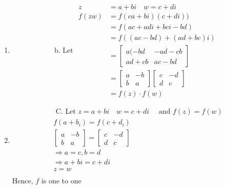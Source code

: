 \documentclass[11pt]{article}
\begin{document}
\begin{enumerate}[{\bf Q1.}]
\begin{enumerate}
			\item 
			\begin{equation}
				\text { b. Let } \begin{aligned}
				z & =a+b i \quad w=c+d i \\
				f(z w) & =f(c a+b i)(c+d i)) \\
				& =f(a c+a d i+b c i-b d) \\
				& =f((a c-b d)+(a d+b c) i) \\
				& =\left[\begin{array}{cc}
				a(-b d & -a d-c b \\
				a d+c b & a c-b d
				\end{array}\right] \\
				& =\left[\begin{array}{cc}
				a & -b \\
				b & a
				\end{array}\right]\left[\begin{array}{cc}
				c & -d \\
				d & c
				\end{array}\right] \\
				& =f(z) \cdot f(w)
				\end{aligned}
				\end{equation}

			\item 
			$$
			\begin{aligned}
			& \text { C. Let } z=a+b i \quad w=c + d i \quad \text { and } f(z)=f(w) \\
			& f\left(a+b_i\right)=f\left(c+d_i\right) \\
			& {\left[\begin{array}{cc}
			a & -b \\
			b & a
			\end{array}\right]=\left[\begin{array}{cc}
			c & -d \\
			d & c
			\end{array}\right]} \\
			& \Rightarrow a=c, b=d \\
			& \Rightarrow a+b i=c+d i \\
			& z=w \\
			&
			\end{aligned}
			$$
			Hence, $f$ is one to one

		\end{enumerate}
		
		\newpage
		

\end{enumerate}
\end{document}
